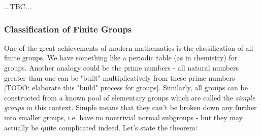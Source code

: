 
...TBC...







\subsubsection{Classification of Finite Groups}
One of the great achievements of modern mathematics is the classification of all finite groups. We have something like a periodic table (as in chemistry) for groups. Another analogy could be the prime numbers - all natural numbers greater than one can be "built" multiplicatively from these prime numbers [TODO: elaborate this "build" process for groups]. Similarly, all groups can be constructed from a known pool of elementary groups which are called the \emph{simple groups} in this context. Simple means that they can't be broken down any further into smaller groups, i.e. have no nontrivial normal subgroups - but they may actually be quite complicated indeed. Let's state the theorem:

